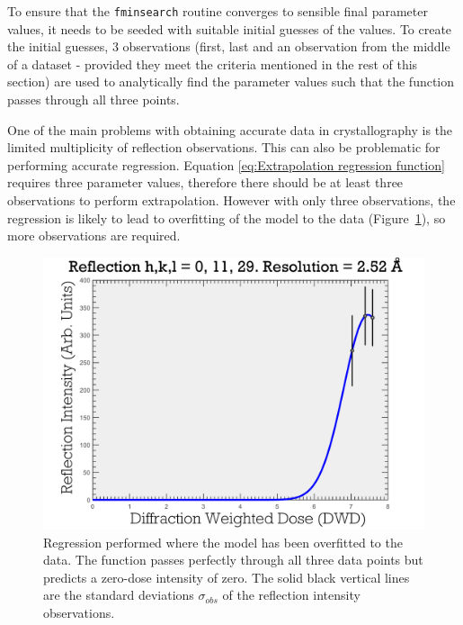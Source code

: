 To ensure that the \verb|fminsearch| routine converges to sensible final parameter values, it needs to be seeded with suitable initial guesses of the values. To create the initial guesses, 3 observations (first, last and an observation from the middle of a dataset - provided they meet the criteria mentioned in the rest of this section) are used to analytically find the parameter values such that the function passes through all three points.

One of the main problems with obtaining accurate data in crystallography is the limited multiplicity of reflection observations.
This can also be problematic for performing accurate regression.
Equation \ref{eq:Extrapolation regression function} requires three parameter values, therefore there should be at least three observations to perform extrapolation.
However with only three observations, the regression is likely to lead to overfitting of the model to the data (Figure~\ref{fig:Data Overfitting to few data points - Extrapolation method}), so more observations are required.
\begin{figure}
  \centering
    \includegraphics[width=1\textwidth]{figures/zde/ReflectionPlot_h,k,l_0,11,29-3obs.pdf}
    \caption{Regression performed where the model has been overfitted to the data.
    The function passes perfectly through all three data points but predicts a zero-dose intensity of zero.
    The solid black vertical lines are the standard deviations $\sigma_{obs}$ of the reflection intensity observations.}
    \label{fig:Data Overfitting to few data points - Extrapolation method}
\end{figure}

